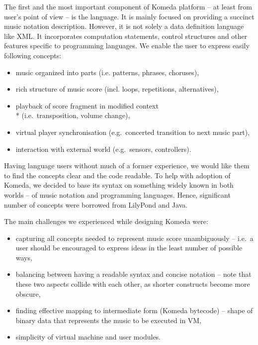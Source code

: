 \documentclass{article}
\begin{document}
The first and the most important component of Komeda platform -- at least from
user's point of view -- is the language.  It is mainly focused on providing a
succinct music notation description.  However, it is not solely a data
definition language like XML. It incorporates computation statements, control
structures and other features specific to programming languages.  We enable the
user to express easily following concepts:

\begin{itemize}
    \setlength{\itemsep}{0pt}
  \item music organized into parts (i.e. patterns, phrases, choruses),
  \item rich structure of music score (incl. loops, repetitions, alternatives),
  \item playback of score fragment in modified context \\*
    (i.e.~transposition, volume change),
  \item virtual player synchronisation (e.g.~concerted transition to next
    music part), 
  \item interaction with external world (e.g.~sensors, controllers).
\end{itemize}

Having language users without much of a former experience, we would like them
to find the concepts clear and the code readable. To help with adoption of
Komeda, we decided to base its syntax on something widely known in both worlds
-- of music notation and programming languages. Hence, significant number
of concepts were borrowed from LilyPond \cite{lily} and Java. 

The main challenges we experienced while designing Komeda were:
\begin{itemize}
    \setlength{\itemsep}{0pt}
  \item capturing all concepts needed to represent music score unambiguously --
    i.e.~a user should be encouraged to express ideas in the least number of
    possible ways,
  \item balancing between having a readable syntax and concise notation -- note
    that these two aspects collide with each other, as shorter constructs
    become more obscure,
  \item finding effective mapping to intermediate form (Komeda bytecode) --
    shape of binary data that represents the music to be executed in VM,
  \item simplicity of virtual machine and user modules.
\end{itemize}
\end{document}
